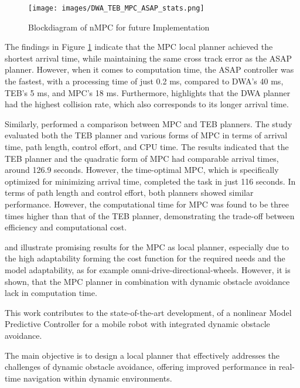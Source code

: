 \documentclass[conference]{IEEEtran}
\begin{document}
\begin{figure}[!h]
    \centering
    \texttt{[image: images/DWA\_TEB\_MPC\_ASAP\_stats.png]}
    \caption{Blockdiagram of nMPC for future Implementation }
    \label{fig:DWA_TEB_MPC_ASAP_stats}
\end{figure}

The findings in Figure \ref{fig:DWA_TEB_MPC_ASAP_stats} indicate that the MPC local planner achieved the shortest arrival time, while maintaining the same cross track error as the ASAP planner. However, when it comes to computation time, the ASAP controller was the fastest, with a processing time of just 0.2 ms, compared to DWA's 40 ms, TEB's 5 ms, and MPC's 18 ms. Furthermore, \cite{ASAP} highlights that the DWA planner had the highest collision rate, which also corresponds to its longer arrival time.

Similarly, \cite{MPCvsTEB} performed a comparison between MPC and TEB planners. The study evaluated both the TEB planner and various forms of MPC in terms of arrival time, path length, control effort, and CPU time. The results indicated that the TEB planner and the quadratic form of MPC had comparable arrival times, around 126.9 seconds. However, the time-optimal MPC, which is specifically optimized for minimizing arrival time, completed the task in just 116 seconds. In terms of path length and control effort, both planners showed similar performance. However, the computational time for MPC was found to be three times higher than that of the TEB planner, demonstrating the trade-off between efficiency and computational cost.

\cite{ASAP} and \cite{MPCvsTEB} illustrate promising results for the MPC as local planner, especially due to the high adaptability forming the cost function for the required needs and the model adaptability, as for example omni-drive-directional-wheels. However, it is shown, that the MPC planner in combination with dynamic obstacle avoidance lack in computation time.

This work contributes to the state-of-the-art development, of a nonlinear Model Predictive Controller for a mobile robot with integrated dynamic obstacle avoidance. 

The main objective is to design a local planner that effectively addresses the challenges of dynamic obstacle avoidance, offering improved performance in real-time navigation within dynamic environments.
\end{document}

